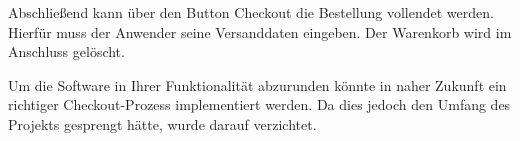 Abschließend kann über den Button Checkout die Bestellung vollendet werden. Hierfür muss der Anwender seine Versanddaten eingeben. Der Warenkorb wird im Anschluss gelöscht.

Um die Software in Ihrer Funktionalität abzurunden könnte in naher Zukunft ein richtiger Checkout-Prozess implementiert werden. Da dies jedoch den Umfang des Projekts gesprengt hätte, wurde darauf verzichtet.




